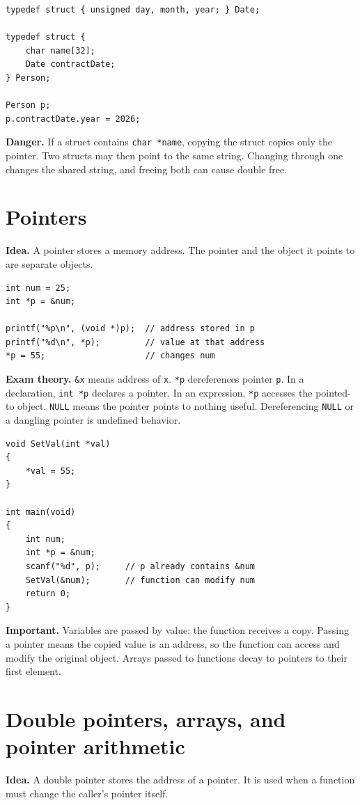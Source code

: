 \documentclass[10pt,a4paper]{article}
\newcommand{\idea}{\noindent\textbf{\textcolor{accentdark}{Idea.}} }
\newcommand{\theory}{\noindent\textbf{\textcolor{accentdark}{Exam theory.}} }
\newcommand{\important}[1]{\par\smallskip\noindent\colorbox{softyellow}{\parbox{\dimexpr\linewidth-2\fboxsep}{\textbf{\textcolor{accentdark}{Important.}} #1}}\par\smallskip}
\newcommand{\danger}[1]{\par\smallskip\noindent\colorbox{softred}{\parbox{\dimexpr\linewidth-2\fboxsep}{\textbf{Danger.} #1}}\par\smallskip}
\begin{document}
\begin{lstlisting}[caption={Nested struct}]
typedef struct { unsigned day, month, year; } Date;

typedef struct {
    char name[32];
    Date contractDate;
} Person;

Person p;
p.contractDate.year = 2026;
\end{lstlisting}

\danger{If a struct contains \texttt{char *name}, copying the struct copies only the pointer. Two structs may then point to the same string. Changing through one changes the shared string, and freeing both can cause double free.}

\section{Pointers}
\idea A pointer stores a memory address. The pointer and the object it points to are separate objects.

\begin{lstlisting}[caption={Basic pointer operations}]
int num = 25;
int *p = &num;

printf("%p\n", (void *)p);  // address stored in p
printf("%d\n", *p);         // value at that address
*p = 55;                    // changes num
\end{lstlisting}

\theory \texttt{\&x} means address of \texttt{x}. \texttt{*p} dereferences pointer \texttt{p}. In a declaration, \texttt{int *p} declares a pointer. In an expression, \texttt{*p} accesses the pointed-to object. \texttt{NULL} means the pointer points to nothing useful. Dereferencing \texttt{NULL} or a dangling pointer is undefined behavior.

\begin{lstlisting}[caption={Pointer with scanf and function parameter}]
void SetVal(int *val)
{
    *val = 55;
}

int main(void)
{
    int num;
    int *p = &num;
    scanf("%d", p);     // p already contains &num
    SetVal(&num);       // function can modify num
    return 0;
}
\end{lstlisting}

\important{Variables are passed by value: the function receives a copy. Passing a pointer means the copied value is an address, so the function can access and modify the original object. Arrays passed to functions decay to pointers to their first element.}

\section{Double pointers, arrays, and pointer arithmetic}
\idea A double pointer stores the address of a pointer. It is used when a function must change the caller's pointer itself.
\end{document}
